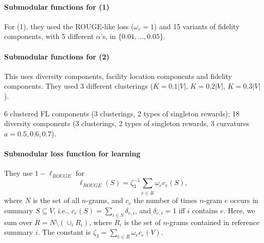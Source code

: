 \documentclass{article}
\newcommand{\union}{\cup}
\begin{document}
\paragraph{Submodular functions for (1)} For (1), they used the ROUGE-like loss ($\omega_e = 1$) and 15 variants of 
fidelity components, with 5 different $\alpha$'s, in $\{0.01, \ldots, 0.05\}$.

\paragraph{Submodular functions for (2)}
This uses diversity components, facility location components and fidelity components. They used 3 different clusterings ($K = 0.1|V|$, $K=0.2|V|$, $K=0.3|V|$).

6 clustered FL components (3 clusterings, 2 types of singleton rewards); 18 diversity components (3 clusterings, 2 types of singleton rewards, 3 curvatures $a=0.5, 0.6, 0.7$).


\paragraph{Submodular loss function for learning}
They use $1-\ell_{ROUGE}$ for
\begin{equation}
  \label{eq:9}
  \ell_{ROUGE}(S) = \zeta_3^{-1}\sum_{e \in \overline{R}}\omega_e c_e(S),
\end{equation}
where $N$ is the set of all $n$-grams, and $c_e$ the number of times $n$-gram $e$ occurs in summary $S \subseteq V$, i.e., $c_e(S) = \sum_{i \in S} \delta_{e,i}$, and $\delta_{e,i} = 1$ iff $i$ contains $e$. Here, we sum over $\overline{R} = N \setminus (\union_i R_i)$, where $R_i$ is the set of $n$-grams contained in reference summary $i$. The constant is $\zeta_3 = \sum_{e \in \overline{R}}\omega_e c_e(V)$.
\end{document}

